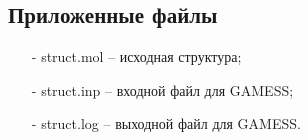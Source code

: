 \subsection{Приложенные файлы}
\begin{itemize}
    \item[-] struct.mol – исходная структура;
    \item[-] struct.inp – входной файл для GAMESS;
    \item[-] struct.log – выходной файл для GAMESS.
\end{itemize}{}